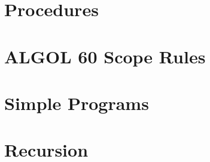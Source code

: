 \documentclass{article}
\begin{document}
\newpage

\section{Procedures}

\newpage

\section{ALGOL 60 Scope Rules} \label{scopeRule}

\newpage

\section{Simple Programs}

\newpage

\section{Recursion}
\end{document}
